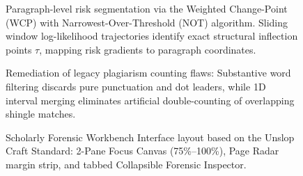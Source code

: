 \begin{figure}[htbp]
    \centering
    
    \caption{Paragraph-level risk segmentation via the Weighted Change-Point (WCP) with Narrowest-Over-Threshold (NOT) algorithm. Sliding window log-likelihood trajectories identify exact structural inflection points $\tau$, mapping risk gradients to paragraph coordinates.}
    \label{fig:localization_wcp_changepoint}
\end{figure}

\begin{figure}[htbp]
    \centering
    
    \caption{Remediation of legacy plagiarism counting flaws: Substantive word filtering discards pure punctuation and dot leaders, while 1D interval merging eliminates artificial double-counting of overlapping shingle matches.}
    \label{fig:plagiarism_interval_merging}
\end{figure}

\begin{figure}[htbp]
    \centering
    
    \caption{Scholarly Forensic Workbench Interface layout based on the Unslop Craft Standard: 2-Pane Focus Canvas (75\%--100\%), Page Radar margin strip, and tabbed Collapsible Forensic Inspector.}
    \label{fig:unslop_ui_flow}
\end{figure}
